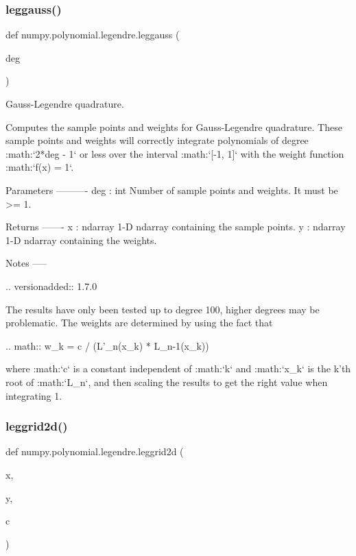 \subsubsection{\texorpdfstring{leggauss()}{leggauss()}}
{\footnotesize\ttfamily def numpy.\+polynomial.\+legendre.\+leggauss (\begin{DoxyParamCaption}\item[{}]{deg }\end{DoxyParamCaption})}

\begin{DoxyVerb}Gauss-Legendre quadrature.

Computes the sample points and weights for Gauss-Legendre quadrature.
These sample points and weights will correctly integrate polynomials of
degree :math:`2*deg - 1` or less over the interval :math:`[-1, 1]` with
the weight function :math:`f(x) = 1`.

Parameters
----------
deg : int
    Number of sample points and weights. It must be >= 1.

Returns
-------
x : ndarray
    1-D ndarray containing the sample points.
y : ndarray
    1-D ndarray containing the weights.

Notes
-----

.. versionadded:: 1.7.0

The results have only been tested up to degree 100, higher degrees may
be problematic. The weights are determined by using the fact that

.. math:: w_k = c / (L'_n(x_k) * L_{n-1}(x_k))

where :math:`c` is a constant independent of :math:`k` and :math:`x_k`
is the k'th root of :math:`L_n`, and then scaling the results to get
the right value when integrating 1.\end{DoxyVerb}
 \mbox{\label{namespacenumpy_1_1polynomial_1_1legendre_abfbcabeb839fdd7446799c81bbde5cd6}} 
\subsubsection{\texorpdfstring{leggrid2d()}{leggrid2d()}}
{\footnotesize\ttfamily def numpy.\+polynomial.\+legendre.\+leggrid2d (\begin{DoxyParamCaption}\item[{}]{x,  }\item[{}]{y,  }\item[{}]{c }\end{DoxyParamCaption})}

